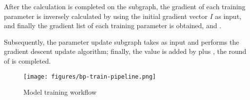 \begin{content}
After the calculation is completed on the subgraph, the gradient of each training parameter is inversely calculated by using the initial gradient vector $I$ as input, and finally the gradient list of each training parameter is obtained, and .

Subsequently, the parameter update subgraph takes  as input and performs the gradient descent update algorithm; finally, the  value is added by  plus , the round of  is completed.

\begin{figure}[!h]
  \centering
  \texttt{[image: figures/bp-train-pipeline.png]}
  \caption{Model training workflow}
  \label{fig:bp-train-pipeline}
\end{figure}

\end{content}
